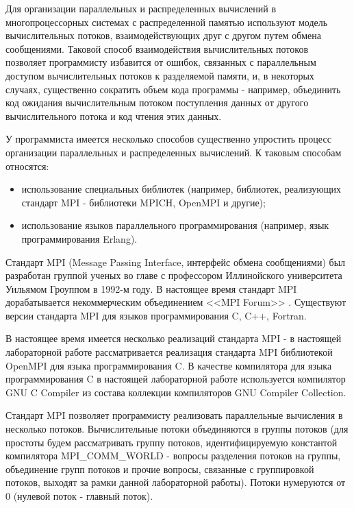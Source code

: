 

Для организации параллельных и распределенных вычислений в многопроцессорных системах с распределенной памятью используют модель вычислительных потоков, взаимодействующих друг с другом путем обмена сообщениями. Таковой способ взаимодействия вычислительных потоков позволяет программисту избавится от ошибок, связанных с параллельным доступом вычислительных потоков к разделяемой памяти, и, в некоторых случаях, существенно сократить объем кода программы - например, объединить код ожидания вычислительным потоком поступления данных от другого вычислительного потока и код чтения этих данных.

У программиста имеется несколько способов существенно упростить процесс организации параллельных и распределенных вычислений. К таковым способам относятся:

\begin{itemize}
	
	\item использование специальных библиотек (например, библиотек, реализующих стандарт MPI - библиотеки MPICH, OpenMPI и другие);
	\item использование языков параллельного программирования (например, язык программирования Erlang).

\end{itemize}


Стандарт MPI (Message Passing Interface, интерфейс обмена сообщениями) был разработан группой ученых во главе с профессором Иллинойского университета Уильямом Гроуппом в 1992-м году. В настоящее время стандарт MPI дорабатывается некоммерческим объединением <<MPI Forum>> \cite{mpi-forum}. Существуют версии стандарта MPI для языков программирования C, C++, Fortran.

В настоящее время имеется несколько реализаций стандарта MPI - в настоящей лабораторной работе рассматривается реализация стандарта MPI библиотекой OpenMPI для языка программирования C. В качестве компилятора для языка программирования C в настоящей лабораторной работе используется компилятор GNU C Compiler из состава коллекции компиляторов GNU Compiler Collection.

Стандарт MPI позволяет программисту реализовать параллельные вычисления в несколько потоков. Вычислительные потоки объединяются в группы потоков (для простоты будем рассматривать группу потоков, идентифицируемую константой компилятора \linebreak MPI\_COMM\_WORLD - вопросы разделения потоков на группы, объединение групп потоков и прочие вопросы, связанные с группировкой потоков, выходят за рамки данной лабораторной работы). Потоки нумеруются от 0 (нулевой поток - главный поток).

